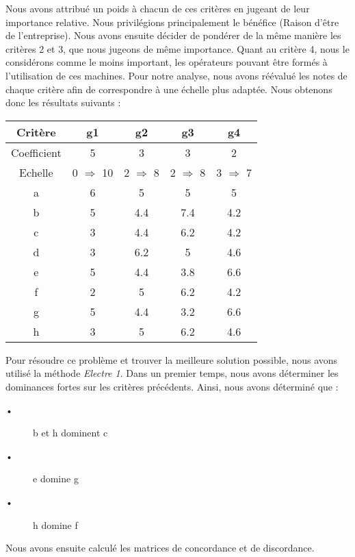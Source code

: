 \documentclass[12pt]{article}
\begin{document}
Nous avons attribué un poids à chacun de ces critères en jugeant de leur importance relative. Nous privilégions principalement le bénéfice (Raison d'être de l'entreprise). Nous avons ensuite décider de pondérer de la même manière les critères 2 et 3, que nous jugeons de même importance. Quant au critère 4, nous le considérons comme le moins important, les opérateurs pouvant être formés à l'utilisation de ces machines.
Pour notre analyse, nous avons réévalué les notes de chaque critère afin de correspondre à une échelle plus adaptée. Nous obtenons donc les résultats suivants :\newline
\begin{center}
\begin{tabular}{|c|c|c|c|c|}
\hline 
Critère & g1 & g2 & g3 & g4 \\ 
\hline 
Coefficient & 5 & 3 & 3 & 2 \\ 
\hline 
Echelle & 0 $ \Rightarrow $ 10 & 2 $ \Rightarrow $ 8 & 2 $ \Rightarrow $ 8 & 3 $ \Rightarrow $ 7 \\ 
\hline 
a & 6 & 5 & 5 & 5 \\ 
\hline 
b & 5 & 4.4 & 7.4 & 4.2 \\ 
\hline 
c & 3 & 4.4 & 6.2 & 4.2 \\ 
\hline 
d & 3 & 6.2 & 5 & 4.6 \\ 
\hline 
e & 5 & 4.4 & 3.8 & 6.6 \\ 
\hline 
f & 2 & 5 & 6.2 & 4.2 \\ 
\hline 
g & 5 & 4.4 & 3.2 & 6.6 \\ 
\hline 
h & 3 & 5 & 6.2 & 4.6 \\ 
\hline 
\end{tabular} 
\end{center}
Pour résoudre ce problème et trouver la meilleure solution possible, nous avons utilisé la méthode \emph{Electre 1}.
Dans un premier temps, nous avons déterminer les dominances fortes sur les critères précédents. Ainsi, nous avons déterminé que :
\begin{description}
\item[•]b et h dominent c
\item[•] e domine g
\item[•] h domine f
\end{description}
Nous avons ensuite calculé les matrices de concordance et de discordance.
\end{document}
